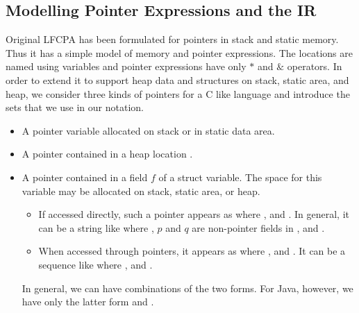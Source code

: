 \documentclass[a4paper,11pt,fleqn]{article}
\newcommand{\var}{\text{\sf\em V\/}\xspace}
\newcommand{\pointer}{\text{\sf\em P\/}\xspace}
\begin{document}
\subsection{Modelling Pointer Expressions and the IR}

Original LFCPA has been formulated for pointers in stack and static
memory. Thus it has a simple model of memory and pointer expressions. 
The locations are named using variables and pointer expressions have only $*$ and $\&$
operators. In order to extend it to support heap data and structures on
stack, static area, and heap, we consider three kinds of pointers for a
C like language and introduce the sets that we use in our notation.

\begin{itemize}
\item A pointer variable \text{$x \in \pointer$} allocated on stack or
      in static data area.

\item A pointer contained in a heap location .

\item A pointer contained in a field $f$ of a struct variable. The      
      space for this variable may be allocated on stack, static area,   
      or heap.                                                          

      \begin{itemize}
      \item If accessed directly, such a pointer appears as  where
            \text{$x \in (\var-\pointer)$}, and .
            In general, it can be a string like 
            where \text{$x \in (\var - \pointer)$}, $p$ and $q$ are
            non-pointer fields in \npfield, and .
      \item When accessed through pointers, it appears as
             where \text{$x \in \pointer$},
            and . It can be a sequence like
             where
            \text{$x \in \pointer$}, and .
      \end{itemize}
      In general, we can have combinations of the two forms. For Java,
      however, we have only the latter form and \text{$\npfield =
      \emptyset$}.
\end{itemize}
\end{document}
